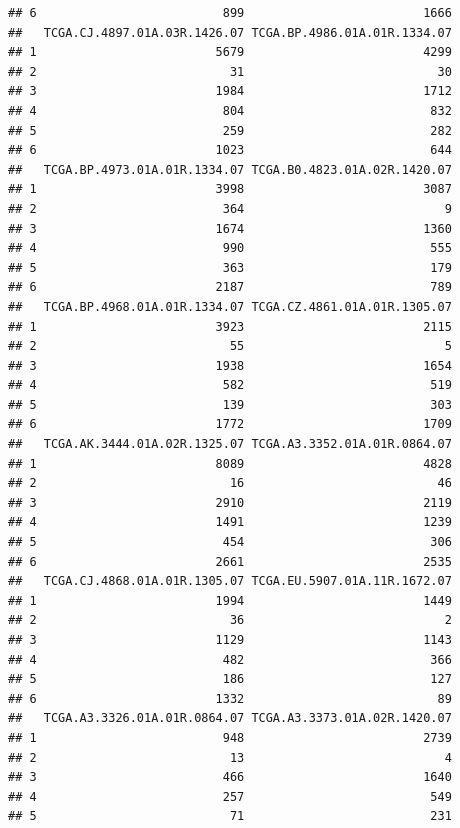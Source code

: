 \documentclass[
]{article}
\begin{document}
\begin{verbatim}
## 6                          899                         1666
##   TCGA.CJ.4897.01A.03R.1426.07 TCGA.BP.4986.01A.01R.1334.07
## 1                         5679                         4299
## 2                           31                           30
## 3                         1984                         1712
## 4                          804                          832
## 5                          259                          282
## 6                         1023                          644
##   TCGA.BP.4973.01A.01R.1334.07 TCGA.B0.4823.01A.02R.1420.07
## 1                         3998                         3087
## 2                          364                            9
## 3                         1674                         1360
## 4                          990                          555
## 5                          363                          179
## 6                         2187                          789
##   TCGA.BP.4968.01A.01R.1334.07 TCGA.CZ.4861.01A.01R.1305.07
## 1                         3923                         2115
## 2                           55                            5
## 3                         1938                         1654
## 4                          582                          519
## 5                          139                          303
## 6                         1772                         1709
##   TCGA.AK.3444.01A.02R.1325.07 TCGA.A3.3352.01A.01R.0864.07
## 1                         8089                         4828
## 2                           16                           46
## 3                         2910                         2119
## 4                         1491                         1239
## 5                          454                          306
## 6                         2661                         2535
##   TCGA.CJ.4868.01A.01R.1305.07 TCGA.EU.5907.01A.11R.1672.07
## 1                         1994                         1449
## 2                           36                            2
## 3                         1129                         1143
## 4                          482                          366
## 5                          186                          127
## 6                         1332                           89
##   TCGA.A3.3326.01A.01R.0864.07 TCGA.A3.3373.01A.02R.1420.07
## 1                          948                         2739
## 2                           13                            4
## 3                          466                         1640
## 4                          257                          549
## 5                           71                          231

\end{verbatim}
\end{document}
